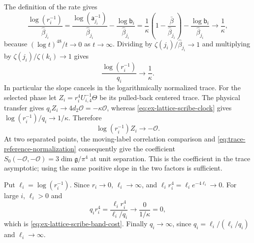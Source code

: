 The definition of the rate gives
\[
 \frac{\log(r_i^{-1})}{\widehat\beta_{j_i}}
 =\frac{\log(\mathsf a_{j_i}^{-1})}{\widehat\beta_{j_i}}
   -\frac{\log\mathsf b_i}{\widehat\beta_{j_i}}
 =\frac1\kappa\left(1-\frac{\bar\beta}{\widehat\beta_{j_i}}\right)
   -\frac{\log\mathsf b_i}{\widehat\beta_{j_i}}
 \longrightarrow\frac1\kappa,
\]
because $(\log t)^{48}/t\to0$ as $t\to\infty$. Dividing by
$\zeta(j_i)/\widehat\beta_{j_i}\to1$ and multiplying by
$\zeta(j_i)/\zeta(k_i)\to1$ gives
\begin{equation}
 \frac{\log(r_i^{-1})}{q_i}\longrightarrow\frac1\kappa.
 \label{eq:ex-lattice-scribe-clock}
\end{equation}
In particular the slope cancels in the logarithmically normalized
trace. For the selected phase let
$Z_i=r_i^4U_{i,4}^{-1}\Theta$ be its pulled-back centered trace. The
physical transfer gives $q_iZ_i\to4d_2\mathcal O=-\kappa\mathcal O$,
whereas \eqref{eq:ex-lattice-scribe-clock} gives
$\log(r_i^{-1})/q_i\to1/\kappa$. Therefore
\begin{equation}\label{eq:scribe-slope-cancellation}
       \log(r_i^{-1})Z_i\longrightarrow-\mathcal O.
\end{equation}
At two separated points, the moving-label correlation comparison and
\eqref{eq:trace-reference-normalization} consequently give the
coefficient $S_0(-\mathcal O,-\mathcal O)=3\dim\mathfrak g/\pi^4$
at unit separation. This is the coefficient in the trace asymptotic;
using the same positive slope in the two factors is sufficient.

Put $\ell_i=\log(r_i^{-1})$. Since $r_i\to0$, $\ell_i\to\infty$, and
$\ell_ir_i^4=\ell_ie^{-4\ell_i}\to0$. For large $i$, $\ell_i>0$ and
\[
 q_ir_i^4=\frac{\ell_ir_i^4}{\ell_i/q_i}\longrightarrow\frac0{1/\kappa}=0,
\]
which is \eqref{eq:ex-lattice-scribe-band-cost}. Finally
$q_i\to\infty$, since $q_i=\ell_i/(\ell_i/q_i)$ and $\ell_i\to\infty$.

